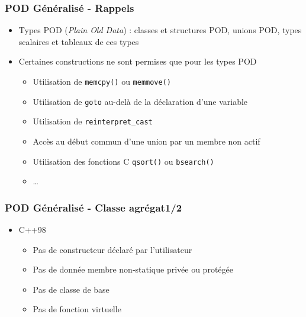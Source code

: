 \documentclass[C++.tex]{subfiles}
\begin{document}
\begin{frame}[fragile]
	\frametitle{POD Généralisé - Rappels}
	\begin{itemize}
		\item Types POD (\textit{Plain Old Data}) : classes et structures POD, unions POD, types scalaires et tableaux de ces types
		\item Certaines constructions ne sont permises que pour les types POD


		\begin{itemize}
			\item Utilisation de \lstinline|memcpy()| ou \lstinline|memmove()|
			\item Utilisation de \lstinline|goto| au-delà de la déclaration d'une variable


			\item Utilisation de \lstinline|reinterpret_cast|
			\item Accès au début commun d'une union par un membre non actif
			\item Utilisation des fonctions C \lstinline|qsort()| ou \lstinline|bsearch()|
			\item \ldots
		\end{itemize}
	\end{itemize}
\end{frame}

\begin{frame}[fragile]
	\frametitle{POD Généralisé - Classe agrégat\titlehfill{}1/2}
	\begin{itemize}
		\item C++98
		\begin{itemize}
			\item Pas de constructeur déclaré par l'utilisateur
			\item Pas de donnée membre non-statique privée ou protégée
			\item Pas de classe de base
			\item Pas de fonction virtuelle
		\end{itemize}
	\end{itemize}
\end{frame}
\end{document}
